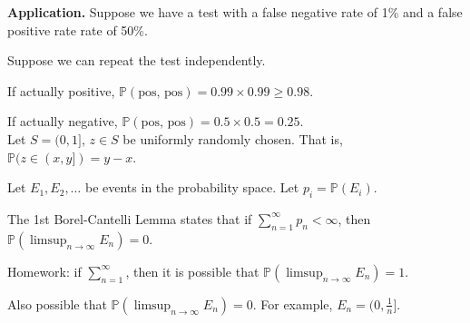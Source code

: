 \documentclass[a4paper,11pt]{amsbook}
\theoremstyle{definition}
\theoremstyle{remark}
\renewcommand{\P}{\mathbb{P}}
\newcommand\0{\varnothing}
\begin{document}
    \noindent \textbf{Application.} Suppose we have a test with a false negative rate of 1\% and a false positive rate rate of 50\%.

    Suppose we can repeat the test independently.

    If actually positive, $\P(\text{pos, pos})=0.99\times0.99\geq0.98$.

    If actually negative, $\P(\text{pos, pos})=0.5\times0.5=0.25$.\\

    Let $S=(0,1]$, $z\in S$ be uniformly randomly chosen.
    That is, $\P(z\in(x,y])=y-x$.

    Let $E_1,E_2,\ldots$ be events in the probability space. Let $p_i=\P(E_i)$.

    The 1st Borel-Cantelli Lemma states that if $\sum_{n=1}^{\infty}p_n<\infty$, then $\P\left(\limsup_{n\to\infty}E_n\right)=0$.

    Homework: if $\sum_{n=1}^{\infty}$, then it is possible that $\P\left(\limsup_{n\to\infty}E_n\right)=1$.

    Also possible that $\P\left(\limsup_{n\to\infty}E_n\right)=0$. For example, $E_n=(0,\tfrac1n]$.
    
\end{document}
